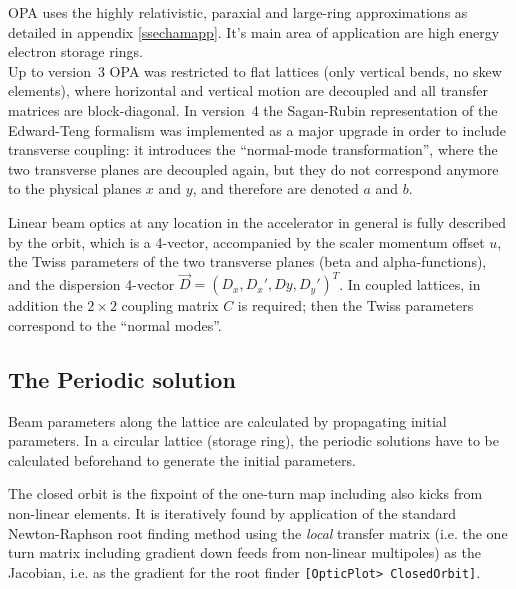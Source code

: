 \documentclass[12pt]{article}
\newcommand\code[1]{{\tt [#1]}}
\begin{document}
OPA uses the highly relativistic, paraxial and large-ring approximations as detailed in appendix \ref{ssechamapp}. It's main area of application are high energy electron storage rings.\\

Up to version~3 OPA was restricted to flat lattices (only vertical bends, no skew elements), where horizontal and vertical motion are decoupled and all transfer matrices are block-diagonal. In version~4 the Sagan-Rubin representation \cite{SAGAN} of the Edward-Teng formalism \cite{EDTENG} was implemented as a major upgrade in order to include transverse coupling: it introduces the ``normal-mode transformation'', where the two transverse planes are decoupled again, but they do not correspond anymore to the physical planes $x$ and $y$, and therefore are denoted $a$ and $b$.

Linear beam optics at any location in the accelerator in general is fully described by the orbit, which is a 4-vector, accompanied by the scaler momentum offset $u$, the Twiss parameters of the two transverse planes (beta and alpha-functions), and the dispersion 4-vector $\vec{D}=(D_x,D_x',Dy,D_y')^T$. In coupled lattices, in addition the $2\times 2$ coupling matrix $C$ is required; then the Twiss parameters correspond to the ``normal modes''.


\subsection{The Periodic solution}
Beam parameters along the lattice are calculated by propagating initial parameters.
In a circular lattice (storage ring), the periodic solutions have to be calculated beforehand to generate the initial parameters.

The closed orbit is the fixpoint of the one-turn map including also kicks from non-linear elements. It is iteratively found by application of the standard Newton-Raphson root finding method using the {\em local} transfer matrix (i.e. the one turn matrix including gradient down feeds from non-linear multipoles) as the Jacobian, i.e. as the gradient for the root finder \code{OpticPlot> ClosedOrbit}.
\end{document}
